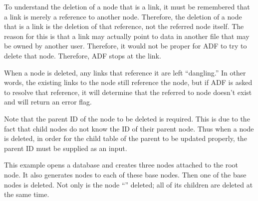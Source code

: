 To understand the deletion of a node that is a link, it must be
remembered that a link is merely a reference to another node.
Therefore, the deletion of a node that is a link is the deletion of that
reference, not the referred node itself.
The reason for this is that a link may actually point to data in another
file that may be owned by another user.
Therefore, it would not be proper for ADF to try to delete that node.
Therefore, ADF stops at the link.

When a node is deleted, any links that reference it are left ``dangling.''
In other words, the existing links to the node still reference the node,
but if ADF is asked to resolve that reference, it will determine that
the referred to node doesn't exist and will return an error flag.

Note that the parent ID of the node to be deleted is required.
This is due to the fact that child nodes do not know the ID of their
parent node.
Thus when a node is deleted, in order for the child table of the parent
to be updated properly, the parent ID must be supplied as an input.

\Example

This example opens a database and creates three nodes attached to the
root node.
It also generates nodes to each of these base nodes.
Then one of the base nodes is deleted.
Not only is the node ``'' deleted; all of its children
are deleted at the same time.

